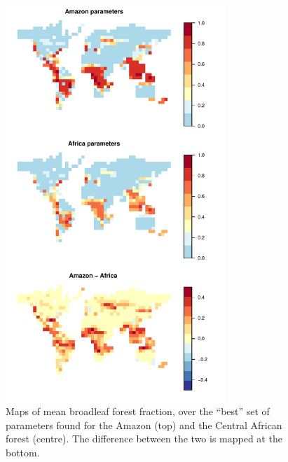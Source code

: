 \documentclass[esd, manuscript]{copernicus}
\begin{document}
\begin{figure}[t]
\includegraphics[width=8.3cm]{graphics/best_X_maps.pdf}
\caption{Maps of mean broadleaf forest fraction, over the ``best'' set of parameters found for the Amazon (top) and the Central African forest (centre). The difference between the two is mapped at the bottom.}
\label{fig:best_X_maps}
\end{figure}
\end{document}

